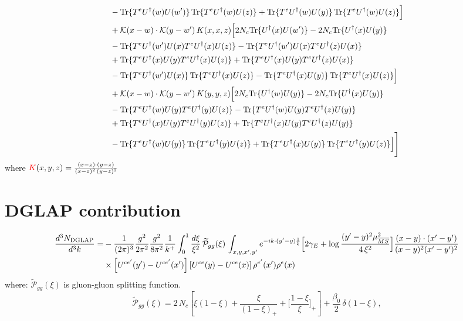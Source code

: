 \documentclass[9pt]{article}
\numberwithin{equation}{section}
\begin{document}
\begin{align}
&-{\rm Tr}\{T^eU^\dagger(w)U(w')\}\,{\rm Tr}\{T^eU^\dagger(w)U(z)\}+{\rm Tr}\{T^eU^\dagger(w)U(y)\}\,{\rm Tr}\{T^eU^\dagger(w)U(z)\}\Big]\notag\\
&+\mathcal K(x-w)\cdot\mathcal K(y-w')\,K(x,x,z)\Big[2 N_{c}{\rm Tr}\{U^\dagger(x)U(w')\}-2 N_{c}{\rm Tr}\{U^\dagger(x)U(y)\}\notag\\
&-{\rm Tr}\{T^eU^\dagger(w')U(x)T^eU^\dagger(x)U(z)\}-{\rm Tr}\{T^eU^\dagger(w')U(x)T^eU^\dagger(z)U(x)\}\notag\\
&+{\rm Tr}\{T^eU^\dagger(x)U(y)T^eU^\dagger(x)U(z)\}+{\rm Tr}\{T^eU^\dagger(x)U(y)T^eU^\dagger(z)U(x)\}\notag\\
&-{\rm Tr}\{T^eU^\dagger(w')U(x)\}\,{\rm Tr}\{T^eU^\dagger(x)U(z)\}-{\rm Tr}\{T^eU^\dagger(x)U(y)\}\,{\rm Tr}\{T^eU^\dagger(x)U(z)\}\Big]\notag\\
&+\mathcal K(x-w)\cdot\mathcal K(y-w')\,K(y,y,z)\Big[2 N_{c}{\rm Tr}\{U^\dagger(w)U(y)\}-2 N_{c}{\rm Tr}\{U^\dagger(x)U(y)\}\notag\\
&-{\rm Tr}\{T^eU^\dagger(w)U(y)T^eU^\dagger(y)U(z)\}-{\rm Tr}\{T^eU^\dagger(w)U(y)T^eU^\dagger(z)U(y)\}\notag\\
&+{\rm Tr}\{T^eU^\dagger(x)U(y)T^eU^\dagger(y)U(z)\}+{\rm Tr}\{T^eU^\dagger(x)U(y)T^eU^\dagger(z)U(y)\}\notag\\
&-{\rm Tr}\{T^eU^\dagger(w)U(y)\}\,{\rm Tr}\{T^eU^\dagger(y)U(z)\}+{\rm Tr}\{T^eU^\dagger(x)U(y)\}\,{\rm Tr}\{T^eU^\dagger(y)U(z)\}\Big]\Bigg]
\end{align}
where ${\color{red}K}(x,y,z) = \frac{(x-z)\cdot (y-z)}{(x-z)^{2}\,(y-z)^{2}}$
\section{DGLAP contribution}
\begin{align}
\frac{d^{3}N_{\rm DGLAP}}{d^{3}k}= &-\frac{1}{(2\pi)^{3}}\frac{g^{2}}{2\pi^{2}}\frac{g^{2}}{8\pi^{2}}\frac{1}{k^{+}}\int_{0}^{1}\frac{d\xi}{\xi^{2}}\,\widetilde{\mathcal P}_{gg}(\xi)\,\int_{x,y,x',y'}e^{-ik\cdot(y'-y)\frac{1}{\xi}}\Big[2\gamma_{E}+\log\frac{(y'-y)^{2}\mu^{2}_{\overline{MS}}}{4\,\xi^{2}}\Big]\frac{(x-y)\cdot(x'-y')}{(x-y)^{2}(x'-y')^{2}}\notag\\
&\times\left[U^{ce'}(y') - U^{ce'}(x')\right]\left[U^{ce}(y) - U^{ce}(x)\right]\rho^{e'}(x')\rho^{e}(x)
\end{align}
where:
$\widetilde{\mathcal{P}}_{gg}(\xi)$ is gluon-gluon splitting function.
$$\widetilde{\mathcal{P}}_{gg}(\xi) = 2\,N_{c}\left[\xi(1-\xi) + \frac{\xi}{(1-\xi)_{+}} + \Big[\frac{1-\xi}{\xi}\Big]_{+}\right]+\frac{\beta_{0}}{2}\,\delta(1-\xi),$$
\end{document}
